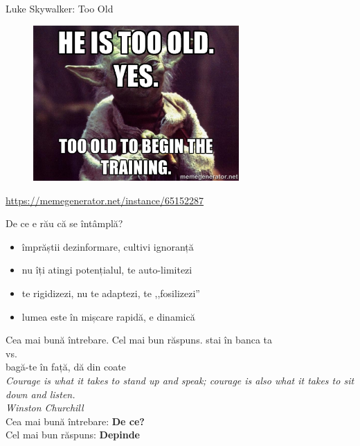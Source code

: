 \documentclass{simple}
\begin{document}
\begin{frame}{Luke Skywalker: Too Old}
  \begin{figure}
    \centering
    \includegraphics[width=0.7\textwidth]{img/yoda-too-old}
  \end{figure}
  \begin{center}
    \scriptsize
    \url{https://memegenerator.net/instance/65152287}
  \end{center}
\end{frame}

\begin{frame}{De ce e rău că se întâmplă?}
  \begin{itemize}
    \pause \item împrăștii dezinformare, cultivi ignoranță
    \pause \item nu îți atingi potențialul, te auto-limitezi
    \pause \item te rigidizezi, nu te adaptezi, te ,,fosilizezi''
    \pause \item lumea este în mișcare rapidă, e dinamică
  \end{itemize}
\end{frame}

\begin{frame}{Cea mai bună întrebare. Cel mai bun răspuns.}
  \centering
  \pause stai în banca ta \\
    \pause vs. \\
  \pause bagă-te în față, dă din coate\\
  \pause
  \vspace{5mm}
  \textit{Courage is what it takes to stand up and speak; courage is also what it takes to sit down and listen.}\\
  \vspace{3mm}
  \hfill \textit{Winston Churchill}\\
  \vspace{5mm}
  \pause Cea mai bună întrebare: \textbf{De ce?} \\
  \pause Cel mai bun răspuns: \textbf{Depinde}
\end{frame}
\end{document}
